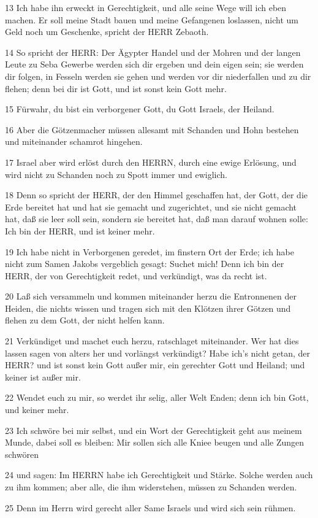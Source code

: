 \par 13 Ich habe ihn erweckt in Gerechtigkeit, und alle seine Wege will ich eben machen. Er soll meine Stadt bauen und meine Gefangenen loslassen, nicht um Geld noch um Geschenke, spricht der HERR Zebaoth.
\par 14 So spricht der HERR: Der Ägypter Handel und der Mohren und der langen Leute zu Seba Gewerbe werden sich dir ergeben und dein eigen sein; sie werden dir folgen, in Fesseln werden sie gehen und werden vor dir niederfallen und zu dir flehen; denn bei dir ist Gott, und ist sonst kein Gott mehr.
\par 15 Fürwahr, du bist ein verborgener Gott, du Gott Israels, der Heiland.
\par 16 Aber die Götzenmacher müssen allesamt mit Schanden und Hohn bestehen und miteinander schamrot hingehen.
\par 17 Israel aber wird erlöst durch den HERRN, durch eine ewige Erlösung, und wird nicht zu Schanden noch zu Spott immer und ewiglich.
\par 18 Denn so spricht der HERR, der den Himmel geschaffen hat, der Gott, der die Erde bereitet hat und hat sie gemacht und zugerichtet, und sie nicht gemacht hat, daß sie leer soll sein, sondern sie bereitet hat, daß man darauf wohnen solle: Ich bin der HERR, und ist keiner mehr.
\par 19 Ich habe nicht in Verborgenen geredet, im finstern Ort der Erde; ich habe nicht zum Samen Jakobs vergeblich gesagt: Suchet mich! Denn ich bin der HERR, der von Gerechtigkeit redet, und verkündigt, was da recht ist.
\par 20 Laß sich versammeln und kommen miteinander herzu die Entronnenen der Heiden, die nichts wissen und tragen sich mit den Klötzen ihrer Götzen und flehen zu dem Gott, der nicht helfen kann.
\par 21 Verkündiget und machet euch herzu, ratschlaget miteinander. Wer hat dies lassen sagen von alters her und vorlängst verkündigt? Habe ich's nicht getan, der HERR? und ist sonst kein Gott außer mir, ein gerechter Gott und Heiland; und keiner ist außer mir.
\par 22 Wendet euch zu mir, so werdet ihr selig, aller Welt Enden; denn ich bin Gott, und keiner mehr.
\par 23 Ich schwöre bei mir selbst, und ein Wort der Gerechtigkeit geht aus meinem Munde, dabei soll es bleiben: Mir sollen sich alle Kniee beugen und alle Zungen schwören
\par 24 und sagen: Im HERRN habe ich Gerechtigkeit und Stärke. Solche werden auch zu ihm kommen; aber alle, die ihm widerstehen, müssen zu Schanden werden.
\par 25 Denn im Herrn wird gerecht aller Same Israels und wird sich sein rühmen.

